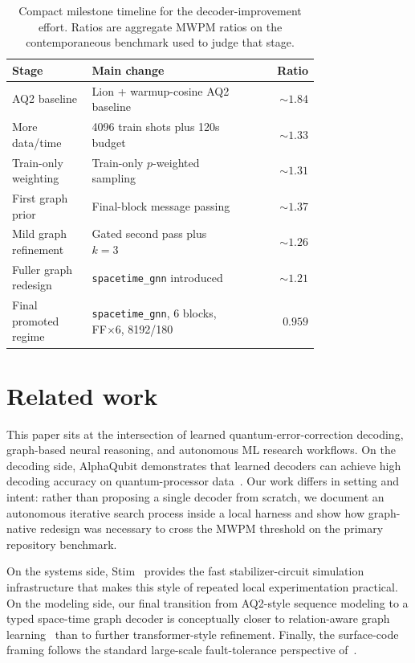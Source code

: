 \documentclass{article}
\begin{document}
\begin{table}[t]
    \centering
    \small
    \caption{Compact milestone timeline for the decoder-improvement effort. Ratios are aggregate MWPM ratios on the contemporaneous benchmark used to judge that stage.}
    \label{tab:timeline}
    \begin{tabular}{p{0.26\linewidth}p{0.50\linewidth}r}
        \toprule
        Stage & Main change & Ratio \\
        \midrule
        AQ2 baseline & Lion + warmup-cosine AQ2 baseline & $\sim 1.84$ \\
        More data/time & 4096 train shots plus 120s budget & $\sim 1.33$ \\
        Train-only weighting & Train-only $p$-weighted sampling & $\sim 1.31$ \\
        First graph prior & Final-block message passing & $\sim 1.37$ \\
        Mild graph refinement & Gated second pass plus $k=3$ & $\sim 1.26$ \\
        Fuller graph redesign & \texttt{spacetime\_gnn} introduced & $\sim 1.21$ \\
        Final promoted regime & \texttt{spacetime\_gnn}, 6 blocks, FF$\times$6, 8192/180 & $\mathbf{0.959}$ \\
        \bottomrule
    \end{tabular}
\end{table}

\section{Related work}
This paper sits at the intersection of learned quantum-error-correction decoding, graph-based neural reasoning, and autonomous ML research workflows. On the decoding side, AlphaQubit demonstrates that learned decoders can achieve high decoding accuracy on quantum-processor data~\citep{Bausch_2024}. Our work differs in setting and intent: rather than proposing a single decoder from scratch, we document an autonomous iterative search process inside a local harness and show how graph-native redesign was necessary to cross the MWPM threshold on the primary repository benchmark.

On the systems side, Stim~\citep{Gidney_2021} provides the fast stabilizer-circuit simulation infrastructure that makes this style of repeated local experimentation practical. On the modeling side, our final transition from AQ2-style sequence modeling to a typed space-time graph decoder is conceptually closer to relation-aware graph learning~\citep{Schlichtkrull_2018} than to further transformer-style refinement. Finally, the surface-code framing follows the standard large-scale fault-tolerance perspective of~\citet{Fowler_2012}.
\end{document}
